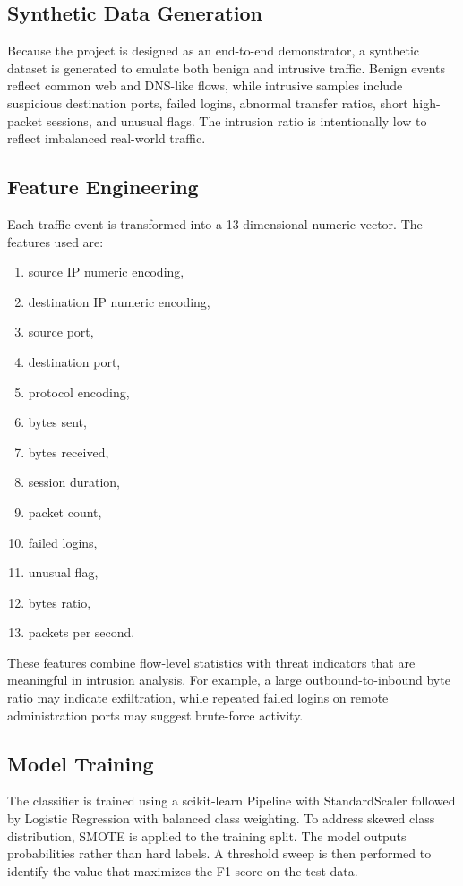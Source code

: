 \documentclass[conference]{IEEEtran}
\begin{document}
\subsection{Synthetic Data Generation}
Because the project is designed as an end-to-end demonstrator, a synthetic dataset is generated to emulate both benign and intrusive traffic. Benign events reflect common web and DNS-like flows, while intrusive samples include suspicious destination ports, failed logins, abnormal transfer ratios, short high-packet sessions, and unusual flags. The intrusion ratio is intentionally low to reflect imbalanced real-world traffic.

\subsection{Feature Engineering}
Each traffic event is transformed into a 13-dimensional numeric vector. The features used are:
\begin{enumerate}
\item source IP numeric encoding,
\item destination IP numeric encoding,
\item source port,
\item destination port,
\item protocol encoding,
\item bytes sent,
\item bytes received,
\item session duration,
\item packet count,
\item failed logins,
\item unusual flag,
\item bytes ratio,
\item packets per second.
\end{enumerate}

These features combine flow-level statistics with threat indicators that are meaningful in intrusion analysis. For example, a large outbound-to-inbound byte ratio may indicate exfiltration, while repeated failed logins on remote administration ports may suggest brute-force activity.

\subsection{Model Training}
The classifier is trained using a scikit-learn Pipeline with StandardScaler followed by Logistic Regression with balanced class weighting. To address skewed class distribution, SMOTE is applied to the training split. The model outputs probabilities rather than hard labels. A threshold sweep is then performed to identify the value that maximizes the F1 score on the test data.
\end{document}
